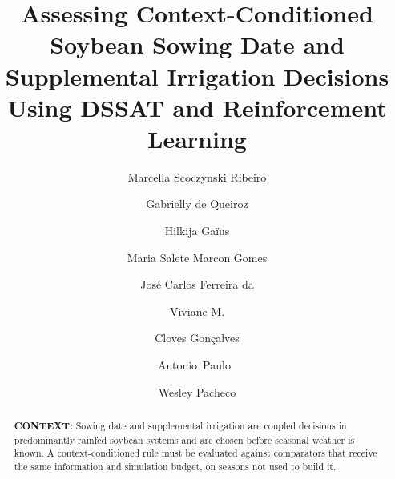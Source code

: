 \documentclass[times,final,authoryear]{elsarticle}
\begin{document}

\begin{frontmatter}

\title{Assessing Context-Conditioned Soybean Sowing Date and Supplemental Irrigation Decisions Using DSSAT and Reinforcement Learning}

\author[2,6,7,8]{Marcella  Scoczynski Ribeiro } %
\author[1]{Gabrielly de Queiroz } %
\author[2]{Hilkija Gaïus } %
\author[1,8]{Maria Salete Marcon Gomes } %
\author[1,8]{José Carlos Ferreira da } %
\author[4,5,6]{Viviane M. } %
\author[4]{Cloves Gonçalves } %
\author[3]{Antonio~Paulo~} %
\author[3,5,6]{Wesley Pacheco } %

\address[1]{State University of Ponta Grossa, Ponta Grossa, Parana/Brazil}
\address[2]{Federal University of Technology - Parana, Brazil}
\address[3]{Institute of Systems and Robotics, Coimbra University, Coimbra/Portugal}
\address[4]{Polytechnic and Arts School, Pontifical Catholic University of Goias, Goiania, Goias/Brazil PC~74.605-010}
\address[5]{Electrical, Mechanical \& Computer Engineering School, Federal University of Goias, Goiania, Goias/Brazil PC~74.605-010}
\address[6]{Experimental \& Technological Research and Study Group, Federal Institute of Goias, Goiania, Goias,  Brazil}
\address[7]{Federal University of Technology - Parana, Graduate Program in Electrical Engineering, Ponta Grossa, Brazil}
\address[8]{State University of Ponta Grossa, Postgraduate Program in Applied Computing, Ponta Grossa, Parana/Brazil}




\begin{abstract}
\textbf{CONTEXT:} Sowing date and supplemental irrigation are coupled decisions in predominantly rainfed soybean systems and are chosen before seasonal weather is known. A context-conditioned rule must be evaluated against comparators that receive the same information and simulation budget, on seasons not used to build it.


\end{abstract}
\end{frontmatter}
\end{document}
